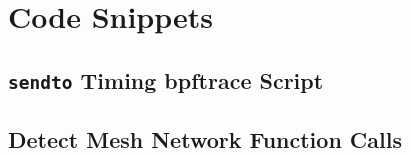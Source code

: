 \chapter{Code Snippets}


\section{\texttt{sendto} Timing bpftrace Script}




\section{Detect Mesh Network Function Calls}


